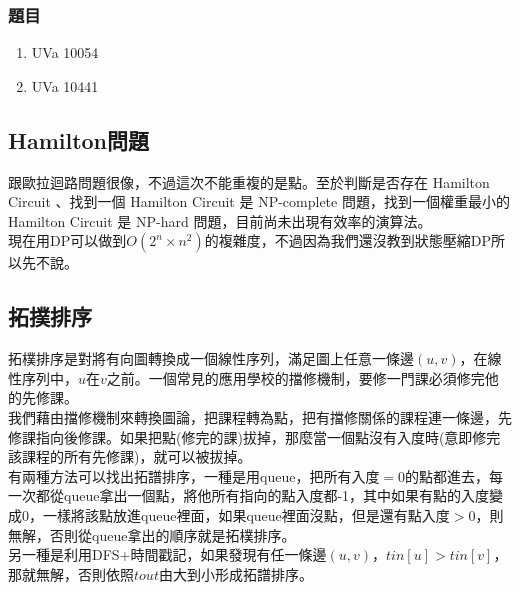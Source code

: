 \subsubsection{題目}
\begin{enumerate}
\item UVa 10054
\item UVa 10441
\end{enumerate}
\subsection{Hamilton問題}
跟歐拉迴路問題很像，不過這次不能重複的是點。至於判斷是否存在 Hamilton Circuit 、找到一個 Hamilton Circuit 是 NP-complete 問題，找到一個權重最小的 Hamilton Circuit 是 NP-hard 問題，目前尚未出現有效率的演算法。\\
現在用DP可以做到$O(2^n\times n^2)$的複雜度，不過因為我們還沒教到狀態壓縮DP所以先不說。
\subsection{拓撲排序}
拓樸排序是對將有向圖轉換成一個線性序列，滿足圖上任意一條邊$(u,v)$，在線性序列中，$u$在$v$之前。一個常見的應用學校的擋修機制，要修一門課必須修完他的先修課。\\
我們藉由擋修機制來轉換圖論，把課程轉為點，把有擋修關係的課程連一條邊，先修課指向後修課。如果把點(修完的課)拔掉，那麼當一個點沒有入度時(意即修完該課程的所有先修課)，就可以被拔掉。\\
有兩種方法可以找出拓譜排序，一種是用queue，把所有入度$=0$的點都進去，每一次都從queue拿出一個點，將他所有指向的點入度都-1，其中如果有點的入度變成0，一樣將該點放進queue裡面，如果queue裡面沒點，但是還有點入度$>0$，則無解，否則從queue拿出的順序就是拓樸排序。\\
另一種是利用DFS+時間戳記，如果發現有任一條邊$(u,v)$，$tin[u]>tin[v]$，那就無解，否則依照$tout$由大到小形成拓譜排序。